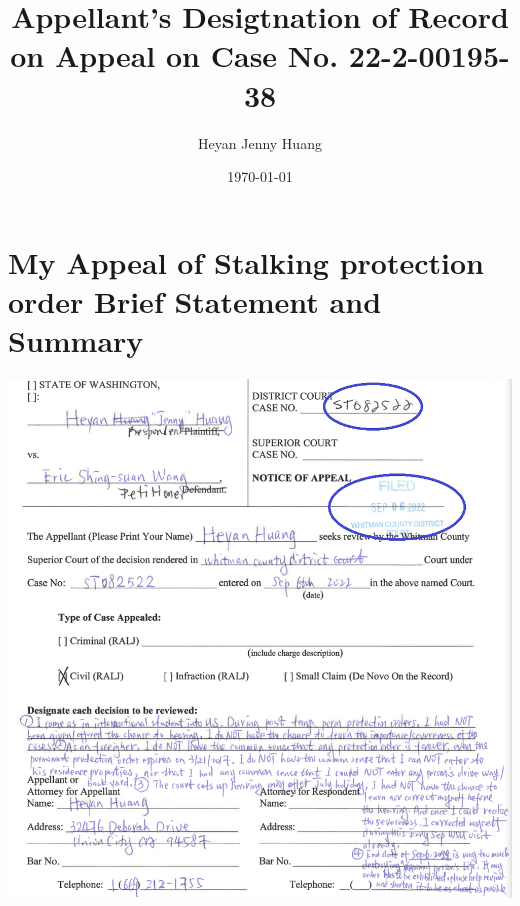 \documentclass[9pt, b5paper]{article}
\author{Heyan Jenny Huang}
\date{\today}
\title{Appellant's Desigtnation of Record on Appeal on Case No. 22-2-00195-38}
\begin{document}
\maketitle
\tableofcontents


\section{My Appeal of Stalking protection order Brief Statement and Summary}
\label{sec-1}

\includegraphics[width=.9\linewidth]{./pic/dearCousin_20220919_222530.png}
\end{document}
